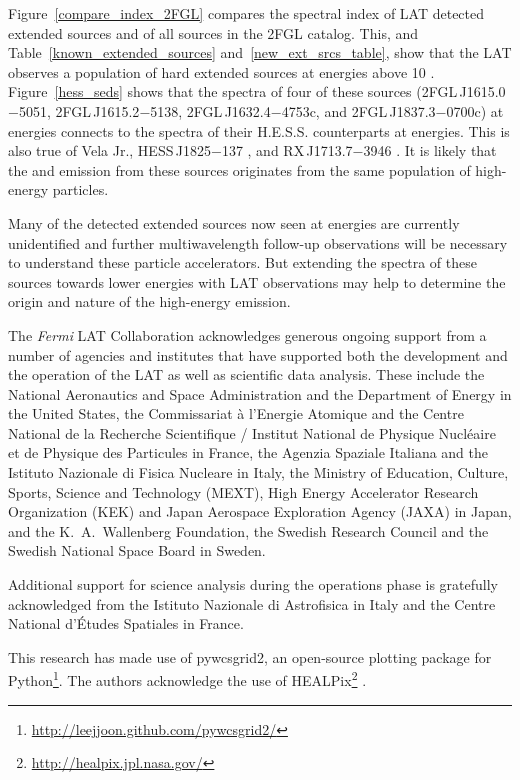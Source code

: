 \documentclass[12pt,preprint]{aastex}
\newcommand{\gev}{\text{GeV}\xspace}
\newcommand{\tev}{\text{TeV}\xspace}
\begin{document}
Figure~\ref{compare_index_2FGL} compares the spectral index of LAT
detected extended sources and of all sources in the 2FGL catalog. This, and
Table~\ref{known_extended_sources} and~\ref{new_ext_srcs_table},
show that the LAT observes a population of hard extended sources
at energies above 10 \gev.  Figure~\ref{hess_seds} shows that
the spectra of four of these sources (2FGL\,J1615.0$-$5051,
2FGL\,J1615.2$-$5138, 2FGL\,J1632.4$-$4753c, and 2FGL\,J1837.3$-$0700c)
at \gev energies connects to the spectra of their H.E.S.S. counterparts
at \tev energies. This is also true of Vela Jr., HESS\,J1825$-$137
\citep{fermi_hess_j1825}, and RX\,J1713.7$-$3946 \citep{rx_j1713_lat}.
It is likely that the \gev and \tev emission from these sources originates
from the same population of high-energy particles.

Many of the \tev detected extended sources now seen at \gev energies
are currently unidentified and further multiwavelength follow-up
observations will be necessary to understand these particle accelerators.
But extending the spectra of these \tev sources towards lower energies
with LAT observations may help to determine the origin and nature of
the high-energy emission.



The \textit{Fermi} LAT Collaboration acknowledges generous ongoing support
from a number of agencies and institutes that have supported both the
development and the operation of the LAT as well as scientific data analysis.
These include the National Aeronautics and Space Administration and the
Department of Energy in the United States, the Commissariat \`a l'Energie Atomique
and the Centre National de la Recherche Scientifique / Institut National de Physique
Nucl\'eaire et de Physique des Particules in France, the Agenzia Spaziale Italiana
and the Istituto Nazionale di Fisica Nucleare in Italy, the Ministry of Education,
Culture, Sports, Science and Technology (MEXT), High Energy Accelerator Research
Organization (KEK) and Japan Aerospace Exploration Agency (JAXA) in Japan, and
the K.~A.~Wallenberg Foundation, the Swedish Research Council and the
Swedish National Space Board in Sweden.

Additional support for science analysis during the operations phase is gratefully
acknowledged from the Istituto Nazionale di Astrofisica in Italy and the Centre National d'\'Etudes Spatiales in France.

This research has made use of
pywcsgrid2, an open-source plotting package for
Python\footnote{\url{http://leejjoon.github.com/pywcsgrid2/}}. The authors acknowledge the
use of HEALPix\footnote{\url{http://healpix.jpl.nasa.gov/}} \citep{healpix}.
\end{document}
